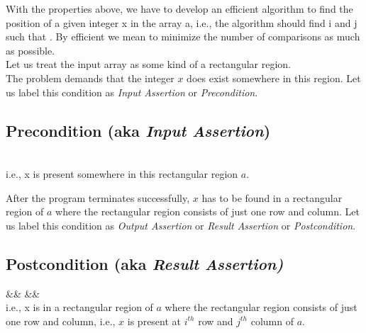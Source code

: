 With the properties above, we have to develop an efficient algorithm to find the position of a given integer x in the array a, i.e., the algorithm should find i and j such that  . By efficient we mean to minimize the number of comparisons as much as possible.
\vspace{3mm}\\
Let us treat the input array as some kind of a rectangular region. 
\vspace{3mm}\\
The problem demands that the integer $x$ does exist somewhere in this region. Let us label this condition as \emph{Input Assertion} or \emph{Precondition}.

\subsection{Precondition (aka \textit{Input Assertion})}

 \vspace{1mm}\\
i.e., x is present somewhere in this rectangular region $a$.

\begin{center}
\end{center}

After the program terminates successfully, $x$ has to be found in a rectangular region of $a$ where the rectangular region consists of just one row and column. Let us label this condition as \emph{Output Assertion} or \emph{Result Assertion} or \emph{Postcondition}.

\subsection{Postcondition (aka \textit{Result Assertion)}}

 \&\&  \&\&  \vspace{1mm}\vspace{1mm}\\
i.e., x is in a rectangular region of $a$ where the rectangular region consists of just one row and column, i.e., $x$ is present at $i^{th}$ row and $j^{th}$ column of $a$.
 
